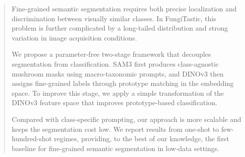 \begin{abstract}



Fine-grained semantic segmentation requires both precise localization and discrimination between visually similar classes. In FungiTastic, this problem is further complicated by a long-tailed distribution and strong variation in image acquisition conditions.

We propose a parameter-free two-stage framework that decouples segmentation from classification. SAM3 first produces class-agnostic mushroom masks using macro-taxonomic prompts, and DINOv3 then assigns fine-grained labels through prototype matching in the embedding space. To improve this stage, we apply a simple transformation of the DINOv3 feature space that improves prototype-based classification.

Compared with class-specific prompting, our approach is more scalable and keeps the segmentation cost low. We report results from one-shot to few-hundred-shot regimes, providing, to the best of our knowledge, the first baseline for fine-grained semantic segmentation in low-data settings.

\end{abstract}